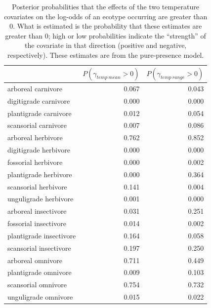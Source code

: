 \begin{table}[ht]
  \centering
  \caption[Posterior probablity of effects of temperature on occurrence]{Posterior probabilities that the effects of the two temperature covariates on the log-odds of an ecotype occurring are greater than 0. What is estimated is the probability that these estimates are greater than 0; high or low probabilities indicate the ``strength'' of the covariate in that direction (positive and negative, respectively). These estimates are from the pure-presence model.}
  \label{tab:occur_temp}
  \begin{tabular}{ l r r }
    \hline
    & \(P(\gamma_{temp\ mean} > 0)\) & \(P(\gamma_{temp\ range} > 0)\) \\ 
    \hline
    arboreal carnivore & 0.067 & 0.043 \\ 
    digitigrade carnivore & 0.000 & 0.000 \\ 
    plantigrade carnivore & 0.012 & 0.054 \\ 
    scansorial carnivore & 0.007 & 0.086 \\ 
    arboreal herbivore & 0.762 & 0.852 \\ 
    digitigrade herbivore & 0.000 & 0.000 \\ 
    fossorial herbivore & 0.000 & 0.002 \\ 
    plantigrade herbivore & 0.000 & 0.364 \\ 
    scansorial herbivore & 0.141 & 0.004 \\ 
    unguligrade herbivore & 0.001 & 0.000 \\ 
    arboreal insectivore & 0.031 & 0.251 \\ 
    fossorial insectivore & 0.014 & 0.002 \\ 
    plantigrade insectivore & 0.164 & 0.058 \\ 
    scansorial insectivore & 0.197 & 0.250 \\ 
    arboreal omnivore & 0.711 & 0.449 \\ 
    plantigrade omnivore & 0.009 & 0.103 \\ 
    scansorial omnivore & 0.754 & 0.732 \\ 
    unguligrade omnivore & 0.015 & 0.022 \\ 
    \hline
  \end{tabular}
\end{table}



